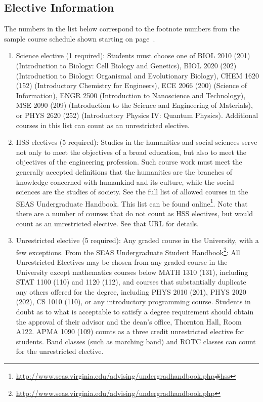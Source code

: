 \documentclass[10pt,letter]{book}
\newcommand{\myurl}[1]{\footnote{\scriptsize\url{#1}}}
\begin{document}
\subsection{Elective Information}
\label{sec:electiveinfo}

The numbers in the list below correspond to the footnote numbers from
the sample course schedule shown starting on
page~\pageref{sec:bscsschedule}.

\begin{enumerate}

\item Science elective (1 required): Students must choose one of BIOL
  2010 (201) (Introduction to Biology: Cell Biology and Genetics),
  BIOL 2020 (202) (Introduction to Biology: Organismal and
  Evolutionary Biology), CHEM 1620 (152) (Introductory Chemistry for
  Engineers), ECE 2066 (200) (Science of Information), ENGR 2500
  (Introduction to Nano\-science and Technology), MSE 2090 (209)
  (Introduction to the Science and Engineering of Materials), or PHYS
  2620 (252) (Introductory Physics IV: Quantum Physics). Additional
  courses in this list can count as an unrestricted elective.

\item HSS electives (5 required): Studies in the humanities and social
  sciences serve not only to meet the objectives of a broad education,
  but also to meet the objectives of the engineering profession. Such
  course work must meet the generally accepted definitions that the
  humanities are the branches of knowledge concerned with humankind
  and its culture, while the social sciences are the studies of
  society. See the full list of allowed courses in the SEAS
  Undergraduate Handbook. This list can be found
  online\myurl{http://www.seas.virginia.edu/advising/undergradhandbook.php\#hss}. Note
  that there are a number of courses that do not count as HSS
  electives, but would count as an unrestricted elective. See that URL
  for details.

\item Unrestricted elective (5 required): Any graded course in the
  University, with a few exceptions. From the SEAS Undergraduate
  Student Handbook\myurl{http://www.seas.virginia.edu/advising/undergradhandbook.php}:
  All Unrestricted Electives may be chosen from any graded course in
  the University except mathematics courses below MATH 1310 (131),
  including STAT 1100 (110) and 1120 (112), and courses that
  substantially duplicate any others offered for the degree, including
  PHYS 2010 (201), PHYS 2020 (202), CS 1010 (110), or any introductory
  programming course. Students in doubt as to what is acceptable to
  satisfy a degree requirement should obtain the approval of their
  advisor and the dean's office, Thornton Hall, Room A122. APMA 1090
  (109) counts as a three credit unrestricted elective for
  students. Band classes (such as marching band) and ROTC classes can
  count for the unrestricted elective.


\end{enumerate}
\end{document}
